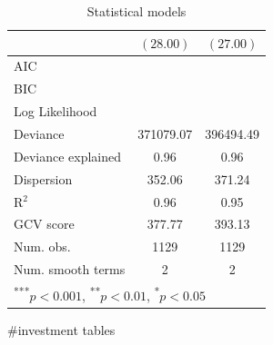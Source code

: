 \documentclass[12pt]{article}
\begin{document}
\begin{table}
\begin{center}
\begin{tabular}{l c c }
                                     & $(28.00)$        & $(27.00)$        \\
\hline
AIC                                  &                  &                  \\
BIC                                  &                  &                  \\
Log Likelihood                       &                  &                  \\
Deviance                             & 371079.07        & 396494.49        \\
Deviance explained                   & 0.96             & 0.96             \\
Dispersion                           & 352.06           & 371.24           \\
R$^2$                                & 0.96             & 0.95             \\
GCV score                            & 377.77           & 393.13           \\
Num. obs.                            & 1129             & 1129             \\
Num. smooth terms                    & 2                & 2                \\
\hline
\multicolumn{3}{l}{\scriptsize{\textsuperscript{***}$p<0.001$, 
  \textsuperscript{**}$p<0.01$, 
  \textsuperscript{*}$p<0.05$}}
\end{tabular}
\caption{Statistical models}
\label{table:pooled}
\end{center}
\end{table} 


#investment tables
\end{document}
